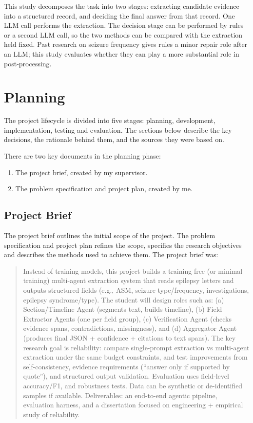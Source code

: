 \documentclass[conference]{IEEEtran}
\begin{document}
This study decomposes the task into two stages: 
extracting candidate evidence into a structured 
record, and deciding the final answer from that 
record. One LLM call performs the extraction. The 
decision stage can be performed by rules or a second LLM 
call, so the two methods can be compared with the 
extraction held fixed. Past research on seizure 
frequency gives rules a minor repair role after an 
LLM; this study evaluates whether they can play
a more substantial role in post-processing.

\section{Planning}

The project lifecycle is divided into five stages:
planning, development, implementation, testing and
evaluation. The sections below describe the key
decisions, the rationale behind them, and the
sources they were based on.

There are two key documents in the planning 
phase: 

\begin{enumerate}
\item The project brief, created by my supervisor.
\item The problem specification and project plan, 
created by me.
\end{enumerate}

\subsection{Project Brief}

The project brief outlines the initial scope of the
project. The problem specification and project
plan refines the scope, specifies the research 
objectives and describes the methods used to
achieve them. The project brief was:

\begin{quote}
Instead of training models, this project builds a 
training-free (or minimal-training) multi-agent 
extraction system that reads epilepsy letters and 
outputs structured fields (e.g., ASM, seizure 
type/frequency, investigations, epilepsy 
syndrome/type). The student will design roles 
such as: (a) Section/Timeline Agent (segments 
text, builds timeline), (b) Field Extractor Agents 
(one per field group), (c) Verification Agent 
(checks evidence spans, contradictions, 
missingness), and (d) Aggregator Agent 
(produces final JSON + confidence + citations 
to text spans). The key research goal is 
reliability: compare single-prompt extraction 
vs multi-agent extraction under the same 
budget constraints, and test improvements 
from self-consistency, evidence requirements 
(“answer only if supported by quote”), and 
structured output validation. Evaluation uses 
field-level accuracy/F1,  and robustness tests. 
Data can be synthetic or de-identified samples 
if available. Deliverables: an end-to-end agentic 
pipeline, evaluation harness, and a dissertation 
focused on engineering + empirical study of 
reliability.
\end{quote}
\end{document}
